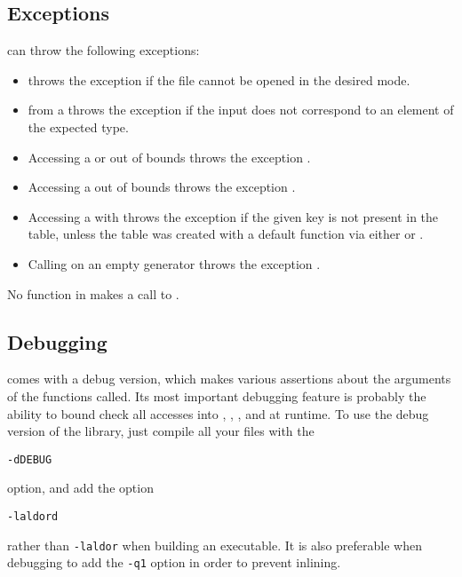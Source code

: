\subsection{Exceptions}
\libaldor{} can throw the following exceptions:
\begin{itemize}
\item
{}
throws the exception  if the file cannot
be opened in the desired mode.
\item
{}
from a 
throws the exception  if the input does
not correspond to an element of the expected type.
\item
Accessing a 
or 
out of bounds throws the exception .
\item
Accessing a 
out of bounds throws the exception .
\item
Accessing a  with 
throws the exception  if the given key
is not present in the table, unless the table was created with
a default function via either  or
.
\item
Calling  on an empty
generator throws the exception .
\end{itemize}
No function in \libaldor{} makes a call to .

\subsection{Debugging}
\libaldor{} comes with a debug version, which makes various assertions
about the arguments of the functions called. Its most important debugging
feature is probably the ability to bound check all accesses into
,
,
,
and  at runtime.
To use the debug version of the
library, just compile all your files with the
\begin{center}
{\tt -dDEBUG}
\end{center}
option, and add the option
\begin{center}
{\tt -laldord}
\end{center}
rather than {\tt -laldor} when building an executable.
It is also preferable when debugging to add the {\tt -q1} option
in order to prevent inlining.

